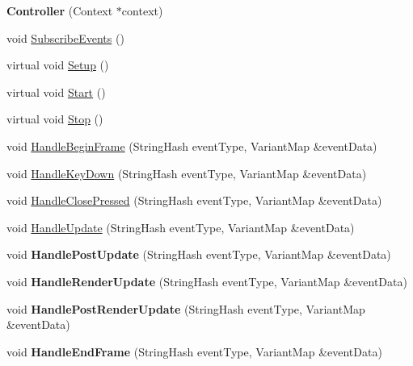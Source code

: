 \begin{DoxyCompactItemize}
\item 
\mbox{\label{class_controller_a1080d606df3b1123894b164ee0d43a5b}} 
{\bfseries Controller} (Context $\ast$context)
\item 
void \mbox{\hyperlink{class_controller_a94c58a56f3af5ab155ae425494ba996a}{Subscribe\+Events}} ()
\item 
virtual void \mbox{\hyperlink{class_controller_a3ca9504f8805a9b8cd6084058158a461}{Setup}} ()
\item 
virtual void \mbox{\hyperlink{class_controller_a27d79f6e08039a2cfb5da6b4d4da6aaf}{Start}} ()
\item 
virtual void \mbox{\hyperlink{class_controller_ad026d93eec698b8333bf9ad138f36007}{Stop}} ()
\item 
void \mbox{\hyperlink{class_controller_acb569db1410bcfc1119fbf971206d706}{Handle\+Begin\+Frame}} (String\+Hash event\+Type, Variant\+Map \&event\+Data)
\item 
void \mbox{\hyperlink{class_controller_ab92e60b1b80d19b872182bb82bff4b39}{Handle\+Key\+Down}} (String\+Hash event\+Type, Variant\+Map \&event\+Data)
\item 
void \mbox{\hyperlink{class_controller_a23b30ec90fc2a9ba09c046723089f1c4}{Handle\+Close\+Pressed}} (String\+Hash event\+Type, Variant\+Map \&event\+Data)
\item 
void \mbox{\hyperlink{class_controller_a7133c51cf9ea02a697febada2e545cc9}{Handle\+Update}} (String\+Hash event\+Type, Variant\+Map \&event\+Data)
\item 
\mbox{\label{class_controller_a04ce84e2190c2cab7426b2070a27bf1b}} 
void {\bfseries Handle\+Post\+Update} (String\+Hash event\+Type, Variant\+Map \&event\+Data)
\item 
\mbox{\label{class_controller_a827d71fa1f77cd029df6a9ead531b792}} 
void {\bfseries Handle\+Render\+Update} (String\+Hash event\+Type, Variant\+Map \&event\+Data)
\item 
\mbox{\label{class_controller_a6871b94adcee0b56b483dbe21ef9d671}} 
void {\bfseries Handle\+Post\+Render\+Update} (String\+Hash event\+Type, Variant\+Map \&event\+Data)
\item 
\mbox{\label{class_controller_a300138399222c7a35feffc551fd7f1b4}} 
void {\bfseries Handle\+End\+Frame} (String\+Hash event\+Type, Variant\+Map \&event\+Data)
\end{DoxyCompactItemize}

